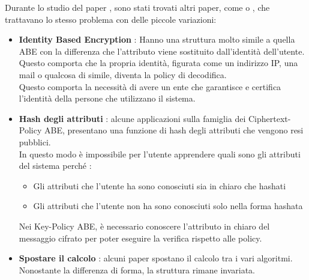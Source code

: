 Durante lo studio del paper \cite{kpabe}, sono stati trovati altri paper, come \cite{sssth} o \cite{benoit}, che trattavano lo stesso problema con delle piccole variazioni:
\begin{itemize}
	\item \textbf{Identity Based Encryption} : Hanno una struttura molto simile a quella ABE con la differenza che l'attributo viene sostituito dall'identità dell'utente. Questo comporta che la propria identità, figurata come un indirizzo IP, una mail o qualcosa di simile, diventa la policy di decodifica.\\
	Questo comporta la necessità di avere un ente che garantisce e certifica l'identità della persone che utilizzano il sistema.
	\item \textbf{Hash degli attributi} : alcune applicazioni \cite{kpabe2} sulla famiglia dei Ciphertext-Policy ABE, presentano una funzione di hash degli attributi che vengono resi pubblici.\\  In questo modo è impossibile per l'utente apprendere quali sono gli attributi del sistema perché :
	\begin{itemize}
		\item Gli attributi che l'utente ha sono conosciuti sia in chiaro che hashati
		\item Gli attributi che l'utente non ha sono conosciuti solo nella forma hashata
	\end{itemize}
	Nei Key-Policy ABE, è necessario conoscere l'attributo in chiaro del messaggio cifrato per poter eseguire la verifica rispetto alle policy.
	\item \textbf{Spostare il calcolo} : alcuni paper spostano il calcolo tra i vari algoritmi. Nonostante la differenza di forma, la struttura rimane invariata.
\end{itemize}